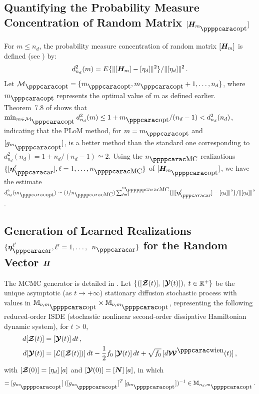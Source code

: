 \subsection[Quantifying the Probability Measure Concentration of Random Matrix H]{Quantifying the Probability Measure Concentration of Random Matrix $[\bfH_{m_\popt}]$}
\label{sec:PLoM.5}
%
For $m\leq n_d$, the probability measure concentration of random matrix $[{\boldsymbol{H}}_{m}]$ is defined (see \cite{Soize2022a}) by:
%
\begin{equation} \label{eqPLoM6}
d_{n_d}^2(m) = E\{\Vert [{\boldsymbol{H}}_m] - [\eta_d]\Vert^2\} /\Vert [\eta_d]\Vert^2\, .
\end{equation}
%
Let $\curM_\opt =\{m_\opt,m_\opt+1,\ldots , n_d\}$, where $m_\opt$ represents the optimal value of $m$ as defined earlier.
Theorem~7.8 of \cite{Soize2020c} shows that
$\min_{m\in\curM_\opt} d_{n_d}^2(m)  \leq 1 + m_\opt/(n_d-1) < d_{n_d}^2(n_d)$, indicating that the PLoM method, for $m=m_\opt$ and $[g_{m_\popt}]$, is a better method than the standard one corresponding to $d_{n_d}^2(n_d)= 1+n_d/(n_d-1)\simeq 2$.
Using the $n_\MC$ realizations $\{[\bfeta_\ar^\ell],\ell=1,\ldots ,n_\MC\}$ of $[\bfH_{m_\popt}]$, we have the estimate
$d_{n_d}^2(m_\opt) \simeq (1/n_\MC)\sum_{\ell=1}^{n_\ppMC}\{\Vert [\bfeta_\ar^\ell]  - [\eta_d]\Vert^2\} /\Vert [\eta_d]\Vert^2$.


\subsection[Generation of Learned Realizations for the Random Vector H]{Generation of Learned Realizations $\{\bfeta^{\ell'}_\ar, \ell'=1,\ldots,$ $n_\ar\}$ for the Random Vector ${\boldsymbol{H}}$}
\label{sec:PLoM.6}
%
The MCMC generator is detailed in \cite{Soize2016}. Let  $\{ ([\boldsymbol{\mathcal{Z}} (t)],$ $[\boldsymbol{\mathcal{Y}}(t)]),$ $t\in {\mathbb{R}}^+ \}$ be  the unique asymptotic (as $t\rightarrow +\infty$) stationary diffusion stochastic process with values in $\MM_{\nu,m_\popt}\times\MM_{\nu,m_\popt}$, representing the following reduced-order ISDE (stochastic nonlinear second-order dissipative Hamiltonian dynamic system), for $t >0$,
%
\begin{align}
 d[{\bfcurZ}(t)]  & =  [{\bfcurY}(t)] \, dt \, , \nonumber \\
  d[{\bfcurY}(t)] & =  [\curL([{\bfcurZ(t)}])]\, dt -\frac{1}{2} f_0\,[{\bfcurY}(t)]\, dt
                   + \sqrt{f_0}\, [d{\bfcurW^\wien}(t)] \, ,  \nonumber
\end{align}
%
with $[\boldsymbol{\mathcal{Z}}(0)] = [\eta_d]\, [a]$ and $[\boldsymbol{\mathcal{Y}}(0)] = [{\boldsymbol{N}} ] \, [a]$, in which
%
\begin{equation}
[a]  = [g_{m_\popt}]\, ([g_{m_\popt}]^T\, [g_{m_\popt}])^{-1} \in \MM_{n_d,m_\popt} \, . \nonumber
\end{equation}

